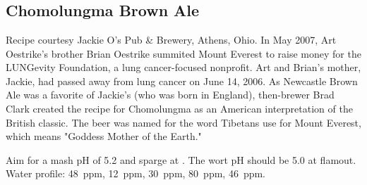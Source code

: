 \part{\stylespecialtybeer}

\chapter*{Chomolungma Brown Ale}

\begin{aboutblock}
Recipe courtesy Jackie O's Pub \& Brewery, Athens, Ohio.
In May 2007, Art Oestrike's brother Brian Oestrike summited Mount Everest
to raise money for the LUNG\-evity Foundation, a lung cancer-focused nonprofit.
Art and Brian's mother, Jackie, had passed away from lung cancer on June 14, 2006.
As Newcastle Brown Ale was a favorite of Jackie's (who was born in England),
then-brewer Brad Clark created the recipe for Chomolungma as an American
interpretation of the British classic. The beer was named for the word Tibetans
use for Mount Everest, which means "Goddess Mother of the Earth."
\end{aboutblock}


\begin{methodandtiming}
 
\begin{mashsteps}
\end{mashsteps}

\begin{fermentationsteps}
\end{fermentationsteps}

\begin{directions}
Aim for a mash pH of 5.2 and sparge at . The wort pH should be 5.0 at
flamout. Water profile:  48~ppm,  12~ppm,  30~ppm,
 80~ppm,  46~ppm.
\end{directions}

\end{methodandtiming}

\pagebreak

